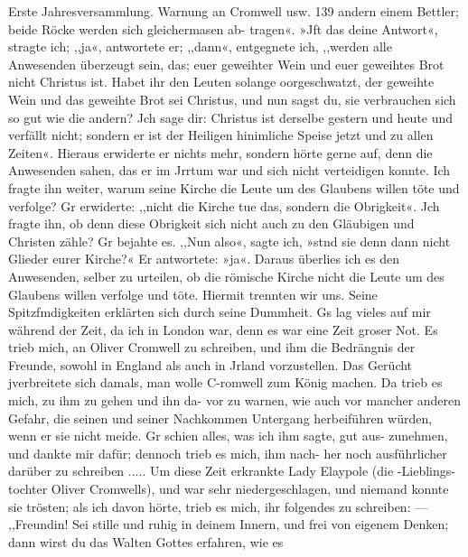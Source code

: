 Erste Jahresversammlung. Warnung an Cromwell usw. 139
andern einem Bettler; beide Röcke werden sich gleichermasen ab-
tragen«. »Jft das deine Antwort«, stragte ich; ,,ja«, antwortete
er; ,,dann«, entgegnete ich, ,,werden alle Anwesenden überzeugt
sein, das; euer geweihter Wein und euer geweihtes Brot nicht
Christus ist. Habet ihr den Leuten solange oorgeschwatzt, der
geweihte Wein und das geweihte Brot sei Christus, und nun
sagst du, sie verbrauchen sich so gut wie die andern? Jch sage
dir: Christus ist derselbe gestern und heute und verfällt nicht;
sondern er ist der Heiligen hinimliche Speise jetzt und zu allen
Zeiten«. Hieraus erwiderte er nichts mehr, sondern hörte gerne
auf, denn die Anwesenden sahen, das er im Jrrtum war und sich
nicht verteidigen konnte. Ich fragte ihn weiter, warum seine
Kirche die Leute um des Glaubens willen töte und verfolge?
Gr erwiderte: ,,nicht die Kirche tue das, sondern die Obrigkeit«.
Jch fragte ihn, ob denn diese Obrigkeit sich nicht auch zu den
Gläubigen und Christen zähle? Gr bejahte es. ,,Nun also«,
sagte ich, »stnd sie denn dann nicht Glieder eurer Kirche?« Er
antwortete: »ja«. Daraus überlies ich es den Anwesenden, selber
zu urteilen, ob die römische Kirche nicht die Leute um des Glaubens
willen verfolge und töte. Hiermit trennten wir uns. Seine
Spitzfmdigkeiten erklärten sich durch seine Dummheit.
Gs lag vieles auf mir während der Zeit, da ich in London
war, denn es war eine Zeit groser Not. Es trieb mich, an
Oliver Cromwell zu schreiben, und ihm die Bedrängnis der
Freunde, sowohl in England als auch in Jrland vorzustellen.
Das Gerücht jverbreitete sich damals, man wolle C-romwell zum
König machen. Da trieb es mich, zu ihm zu gehen und ihn da-
vor zu warnen, wie auch vor mancher anderen Gefahr, die seinen
und seiner Nachkommen Untergang herbeiführen würden, wenn
er sie nicht meide. Gr schien alles, was ich ihm sagte, gut aus-
zunehmen, und dankte mir dafür; dennoch trieb es mich, ihm nach-
her noch ausführlicher darüber zu schreiben .....
Um diese Zeit erkrankte Lady Elaypole (die -Lieblings-tochter
Oliver Cromwells), und war sehr niedergeschlagen, und niemand
konnte sie trösten; als ich davon hörte, trieb es mich, ihr folgendes
zu schreiben: —
,,Freundin!
Sei stille und ruhig in deinem Innern, und frei von eigenem
Denken; dann wirst du das Walten Gottes erfahren, wie es

